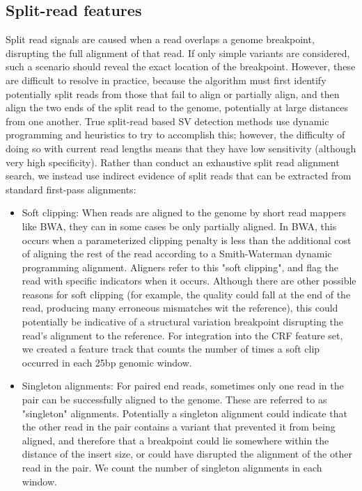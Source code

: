\subsection{Split-read features}

Split read signals are caused when a read overlaps a genome breakpoint, disrupting the full alignment of that read. If only simple variants are considered, such a scenario should reveal the exact location of the breakpoint. However, these are difficult to resolve in practice, because the algorithm must first identify potentially split reads from those that fail to align or partially align, and then align the two ends of the split read to the genome, potentially at large distances from one another. True split-read based SV detection methods use dynamic programming and heuristics to try to accomplish this; however, the difficulty of doing so with current read lengths means that they have low sensitivity (although very high specificity). Rather than conduct an exhaustive split read alignment search, we instead use indirect evidence of split reads that can be extracted from standard first-pass alignments:

\begin{itemize}
\item Soft clipping: When reads are aligned to the genome by short read mappers like BWA, they can in some cases be only partially aligned. In BWA, this occurs when a parameterized clipping penalty is less than the additional cost of aligning the rest of the read according to a Smith-Waterman dynamic programming alignment. Aligners refer to this "soft clipping", and flag the read with specific indicators when it occurs. Although there are other possible reasons for soft clipping (for example, the quality could fall at the end of the read, producing many erroneous mismatches wit the reference), this could potentially be indicative of a structural variation breakpoint disrupting the read's alignment to the reference. For integration into the CRF feature set, we created a feature track that counts the number of times a soft clip occurred in each 25bp genomic window.

\item Singleton alignments: For paired end reads, sometimes only one read in the pair can be successfully aligned to the genome. These are referred to as "singleton" alignments. Potentially a singleton alignment could indicate that the other read in the pair contains a variant that prevented it from being aligned, and therefore that a breakpoint could lie somewhere within the distance of the insert size, or could have disrupted the alignment of the other read in the pair. We count the number of singleton alignments in each window. 
\end{itemize}

